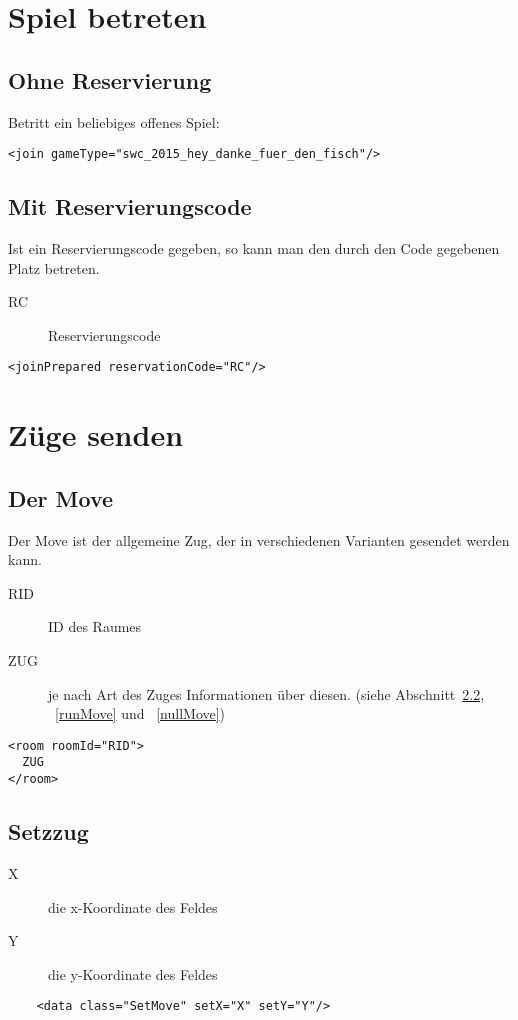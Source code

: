 \documentclass[12pt,a4paper, ngerman, oneside]{scrartcl}
\begin{document}
\section{Spiel betreten}
\subsection{Ohne Reservierung}
Betritt ein beliebiges offenes Spiel:
\begin{verbatim}
<join gameType="swc_2015_hey_danke_fuer_den_fisch"/>
\end{verbatim}
\subsection{Mit Reservierungscode}
Ist ein Reservierungscode gegeben, so kann man den durch den Code gegebenen Platz betreten.
\begin{description}
\item[RC] Reservierungscode
\end{description}
\begin{verbatim}
<joinPrepared reservationCode="RC"/>
\end{verbatim}

\section{Züge senden}

\subsection{\label{Move}Der Move}
Der Move ist der allgemeine Zug, der in verschiedenen Varianten gesendet werden kann.
\begin{description}
\item[RID] ID des Raumes
\item[ZUG] je nach Art des Zuges Informationen über diesen. (siehe
Abschnitt~\ref{setMove}, ~\ref{runMove} und ~\ref{nullMove})
\end{description}
\begin{verbatim}
<room roomId="RID">
  ZUG
</room>

\end{verbatim}
\subsection{Setzzug}
\label{setMove}
\begin{description}
\item[X] die x-Koordinate des Feldes
\item[Y] die y-Koordinate des Feldes
\end{description}
\begin{verbatim}
	<data class="SetMove" setX="X" setY="Y"/>
\end{verbatim}
\end{document}
